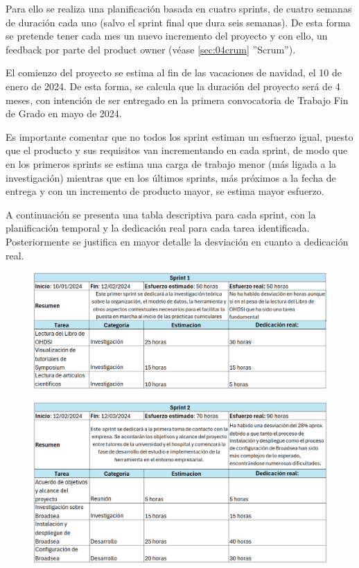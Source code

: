 Para ello se realiza una planificación basada en cuatro sprints, de cuatro semanas de duración cada uno (salvo el sprint final que dura seis semanas). De esta forma se pretende tener cada mes un nuevo incremento del proyecto y con ello, un feedback por parte del product owner (véase \ref{sec:04crum} ''Scrum''). 

El comienzo del proyecto se estima al fin de las vacaciones de navidad, el 10 de enero de 2024. De esta forma, se calcula que la duración del proyecto será de 4 meses, con intención de ser entregado en la primera convocatoria de Trabajo Fin de Grado en mayo de 2024.

Es importante comentar que no todos los sprint estiman un esfuerzo igual, puesto que el producto y sus requisitos van incrementando en cada sprint, de modo que en los primeros sprints se estima una carga de trabajo menor (más ligada a la investigación) mientras que en los últimos sprints, más próximos a la fecha de entrega y con un incremento de producto mayor, se estima mayor esfuerzo.

A continuación se presenta una tabla descriptiva para cada sprint, con la planificación temporal y la dedicación real para cada tarea identificada. Posteriormente se justifica en mayor detalle la desviación en cuanto a dedicación real.

\begin{figure}[H]
    \centering
    \includegraphics[width=1\textwidth]{tables/sprint1cap.png}
    \label{table:sprint1cap}
\end{figure}

\begin{figure}[H]
    \centering
    \includegraphics[width=1\textwidth]{tables/sprint2cap.png}
    \label{table:sprint2cap}
\end{figure}

